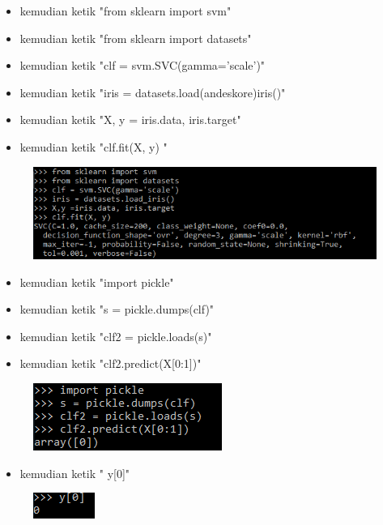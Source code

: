 \begin{enumerate}
\begin{figure}[ht]
\caption{}
\end{figure}
\begin{itemize}
\item kemudian  ketik "from sklearn import svm"
\item kemudian  ketik "from sklearn import datasets"
\item kemudian  ketik "clf = svm.SVC(gamma='scale')"
\item kemudian  ketik "iris = datasets.load(andeskore)iris()"
\item kemudian  ketik "X, y = iris.data, iris.target"
\item kemudian  ketik "clf.fit(X, y) "
\end{itemize}
\begin{figure}[ht]
\centering
\includegraphics[scale=0.5]{figures/puad9.png}
\caption{}
\end{figure}
\begin{itemize}
\item kemudian  ketik "import pickle"
\item kemudian  ketik "s = pickle.dumps(clf)"
\item kemudian  ketik "clf2 = pickle.loads(s)"
\item kemudian  ketik "clf2.predict(X[0:1])"
\end{itemize}
\begin{figure}[ht]
\centering
\includegraphics[scale=0.5]{figures/puad10.png}
\caption{}
\end{figure}
\begin{itemize}
\item kemudian  ketik " y[0]"
\end{itemize}
\begin{figure}[ht]
\centering
\includegraphics[scale=0.5]{figures/puad11.png}

\end{figure}
\end{enumerate}

